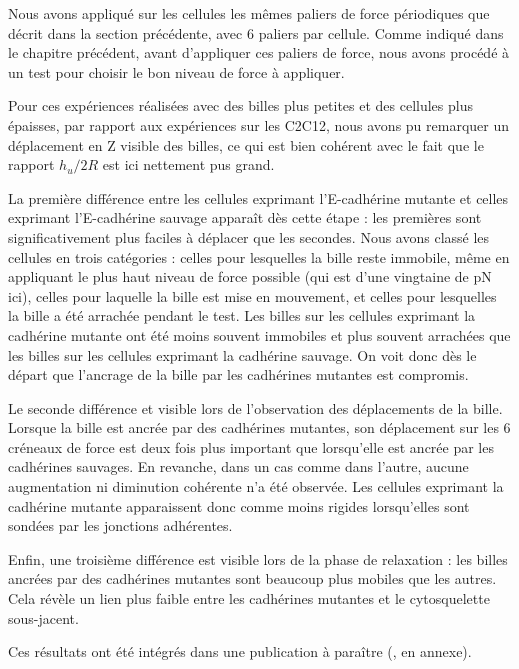  Nous avons appliqué sur les cellules les mêmes paliers de force périodiques que décrit dans la section précédente, avec 6 paliers par cellule. Comme indiqué dans le chapitre précédent, avant d'appliquer ces paliers de force, nous avons procédé à un test pour choisir le bon niveau de force à appliquer. 

 Pour ces expériences réalisées avec des billes plus petites et des cellules plus épaisses, par rapport aux expériences sur les C2C12, nous avons pu remarquer un déplacement en Z visible des billes, ce qui est bien cohérent avec le fait que le rapport $h_u/2R$ est ici nettement pus grand.
 
 La première différence entre les cellules exprimant l'E-cadhérine mutante et celles exprimant l'E-cadhérine sauvage apparaît dès cette étape : les premières  sont significativement plus faciles à déplacer que les secondes. Nous avons classé les cellules en trois catégories : celles pour lesquelles la bille reste immobile, même en appliquant le plus haut niveau de force possible (qui est d'une vingtaine de pN ici), celles pour laquelle la bille est mise en mouvement, et celles pour lesquelles la bille a été arrachée pendant le test. Les billes sur les cellules exprimant la cadhérine mutante ont été moins souvent immobiles et plus souvent arrachées que les billes sur les cellules exprimant la cadhérine sauvage. On voit donc dès le départ que l'ancrage de la bille par les cadhérines mutantes est compromis. 
 
 Le seconde différence et visible lors de l'observation des déplacements de la bille. Lorsque la bille est ancrée par des cadhérines mutantes, son déplacement sur les 6 créneaux de force est deux fois plus important que lorsqu'elle est ancrée par les cadhérines sauvages. En revanche, dans un cas comme dans l'autre, aucune augmentation ni diminution cohérente n'a été observée. Les cellules exprimant la cadhérine mutante apparaissent donc comme moins rigides lorsqu'elles sont sondées par les jonctions adhérentes. 
 
 Enfin, une troisième différence est visible lors de la phase de relaxation : les billes ancrées par des cadhérines mutantes sont beaucoup plus mobiles que les autres. Cela révèle un lien plus faible entre les cadhérines mutantes et le cytosquelette sous-jacent. 

 Ces résultats ont été intégrés dans une publication à paraître (\cite{strale_formation_2012}, en annexe).


